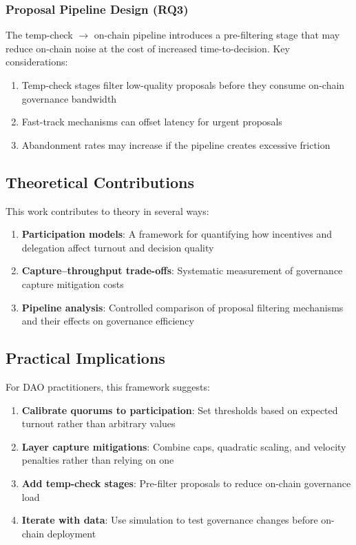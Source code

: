 \subsubsection{Proposal Pipeline Design (RQ3)}

The temp-check $\rightarrow$ on-chain pipeline introduces a pre-filtering stage that may reduce on-chain noise at the cost of increased time-to-decision. Key considerations:

\begin{enumerate}
    \item Temp-check stages filter low-quality proposals before they consume on-chain governance bandwidth
    \item Fast-track mechanisms can offset latency for urgent proposals
    \item Abandonment rates may increase if the pipeline creates excessive friction
\end{enumerate}

\subsection{Theoretical Contributions}

This work contributes to theory in several ways:

\begin{enumerate}
    \item \textbf{Participation models}: A framework for quantifying how incentives and delegation affect turnout and decision quality
    \item \textbf{Capture--throughput trade-offs}: Systematic measurement of governance capture mitigation costs
    \item \textbf{Pipeline analysis}: Controlled comparison of proposal filtering mechanisms and their effects on governance efficiency
\end{enumerate}

\subsection{Practical Implications}

For DAO practitioners, this framework suggests:

\begin{enumerate}
    \item \textbf{Calibrate quorums to participation}: Set thresholds based on expected turnout rather than arbitrary values
    \item \textbf{Layer capture mitigations}: Combine caps, quadratic scaling, and velocity penalties rather than relying on one
    \item \textbf{Add temp-check stages}: Pre-filter proposals to reduce on-chain governance load
    \item \textbf{Iterate with data}: Use simulation to test governance changes before on-chain deployment
\end{enumerate}

